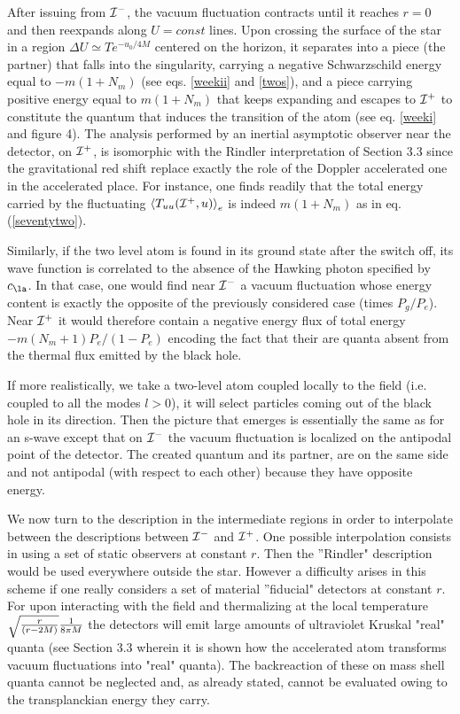 After issuing from ${\cal I}^-$, the vacuum fluctuation
 contracts until it reaches $r=0$ and then reexpands along $U=const$
lines. Upon crossing the
surface of the star in a region $\Delta U \simeq T e^{-u_0/4M}$
centered on the horizon,
it separates
into a piece (the partner)
that
falls into the singularity,
carrying a negative Schwarzschild
energy equal to $- m(1+N_m)$ (see eqs. \ref{weekii} and \ref{twos}),
and a piece carrying positive
energy equal to $ m(1+N_m)$ that keeps expanding and escapes to ${\cal
I}^+$ to constitute the quantum that induces the
transition of the atom (see eq. \ref{weeki} and figure 4).
The analysis performed by an inertial asymptotic observer near the
detector, on ${\cal
I}^+$,
is isomorphic with
the Rindler interpretation of Section 3.3 since the gravitational red shift
replace exactly the role of the Doppler accelerated one in
the accelerated place.
For instance, one finds readily that the total energy carried by the
fluctuating $\mbox{$ \langle T_{uu}({\cal I^+},u) \rangle $}_{e}$ is indeed $m(1+N_m)$ as in
eq. (\ref{seventytwo}).

Similarly, if the two level atom is found
in its ground state
 after the switch off,
its wave function
is correlated to the absence of the Hawking photon specified by $c_\la$.
In that case, one would find near ${\cal I}^-$ a vacuum fluctuation whose
energy content is exactly the opposite of the previously considered
case (times $P_g/P_e$).
Near ${\cal I}^+$ it
would therefore
contain a negative energy flux of total energy $-
 m (N_m + 1) P_e/ (1- P_e)$  encoding the fact that their are quanta
absent from the thermal flux emitted by the black hole.

If more realistically, we take
a two-level atom coupled locally to the field
(i.e. coupled to all the modes $l>0$),
 it
will
select
particles coming out of the black hole in its direction. Then the picture
that emerges is essentially the same as for
an s-wave
except that on ${\cal I}^-$ the vacuum fluctuation is localized
on the antipodal point of the detector.
The  created quantum and its partner,
 are on the same side and
not antipodal
(with respect to each other)
because they have opposite energy.

We now turn to the description in the intermediate regions in order to
interpolate between the descriptions between
${\cal I}^-$ and ${\cal I}^+$.
One possible interpolation
consists in using a set of static observers at constant $r$.
Then the ''Rindler" description would be used everywhere outside the
star. However a difficulty arises in this scheme if one really considers a
set of material ''fiducial" \cite{sus1}
detectors
at constant $r$. For upon interacting
with the field and thermalizing at the local temperature
$\sqrt{r\over(r-2M)}{1 \over 8 \pi M}$ the
detectors will emit large amounts of
ultraviolet Kruskal
"real"
quanta (see Section 3.3 wherein it is shown how the accelerated atom
transforms vacuum fluctuations into "real" quanta). The backreaction of
these
on mass shell quanta
cannot be neglected and, as already stated, cannot be evaluated
owing to the transplanckian energy
they carry.


